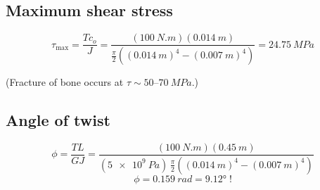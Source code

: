 \documentclass[11pt]{article}
\begin{document}
\subsection*{Maximum shear stress}
\[
  \tau_{\max} = \frac{Tc_o}{J}
  = \frac{(\SI{100}{N.m})(\SI{0.014}{m})}
         {\frac{\pi}{2}\left((\SI{0.014}{m})^4 - (\SI{0.007}{m})^4\right)}
  = \boxed{\SI{24.75}{MPa}}
\]
\begin{center}
  (Fracture of bone occurs at $\tau \sim 50$--$\SI{70}{MPa}$.)
\end{center}

\subsection*{Angle of twist}
\[
  \phi = \frac{TL}{GJ}
  = \frac{(\SI{100}{N.m})(\SI{0.45}{m})}
         {(\SI{5e9}{Pa})\,\frac{\pi}{2}\left((\SI{0.014}{m})^4 - (\SI{0.007}{m})^4\right)}
\]
\[
  \boxed{\phi = \SI{0.159}{rad} = \ang{9.12}} \;\text{!}
\]
\end{document}
